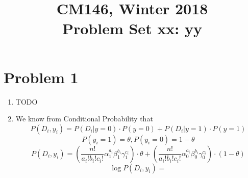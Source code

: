 \documentclass[11pt]{article}
\newcommand{\cnum}{CM146}
\newcommand{\ced}{Winter 2018}
\newcommand{\ctitle}[3]{\title{\vspace{-0.5in}\cnum, \ced\\Problem Set #1: #2}}
\newcommand{\solution}[1]{{{\color{blue}{\bf Solution:} {#1}}}}
\begin{document}
\ctitle{xx}{yy}
\author{}
\date{}
\maketitle
\vspace{-0.75in}

\section{Problem 1}
\begin{enumerate}
\item \solution{} \newline
TODO

\item \solution{} \newline
We know from Conditional Probability that
$$
P(D_i, y_i) = P(D_i | y = 0) \cdot P (y = 0) + P(D_i | y = 1) \cdot P (y = 1)
$$
$$
P(y_i = 1) = \theta, P(y_i = 0) = 1 - \theta
$$
$$
P(D_i, y_i) = \left(\frac{n!}{a_i ! b_i ! c_i !} \alpha_1^{a_i} \beta_1^{b_i} \gamma_1^{c_i} \right) \cdot \theta
				+ \left(\frac{n!}{a_i ! b_i ! c_i !} \alpha_0^{a_i} \beta_0^{b_i} \gamma_0^{c_i} \right) \cdot (1 - \theta)
$$
$$
\log P(D_i, y_i) = 
$$
\end{enumerate}

\newpage
\end{document}
